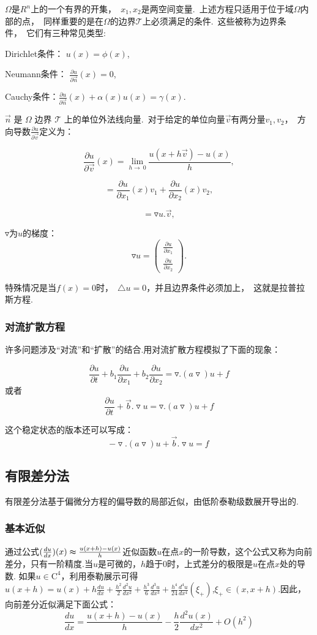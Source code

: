 \documentclass{article}
\begin{document}
$\Omega$是$R^n$上的一个有界的开集，~$x_1,x_2$是两空间变量.~上述方程只适用于位于域$\Omega$内部的点，~同样重要的是在$\Omega$的边界$\mathcal{T}$上必须满足的条件.~这些被称为边界条件，~它们有三种常见类型:

Dirichlet条件：           $u(x)=\phi (x)$,

Neumann条件：             $\frac{\partial u}{\partial \vec{n}}(x)=0$,

Cauchy条件：$\frac{\partial u}{\partial \vec{n}}(x)+\alpha(x)u(x)=\gamma (x)$.

 $\vec n$ 是 $\Omega$ 边界 $\mathcal{T}$ 上的单位外法线向量.~对于给定的单位向量$\vec{v}$有两分量$v_1,v_2$，~方向导数$\frac{\partial u}{\partial \vec{v}}$定义为：
 
 $$\frac{\partial u}{\partial \vec{v}}(x)=\lim_{h \to\ 0}\frac{u(x+h\vec{v})-u(x)}{h},$$

 $$=\frac{\partial u}{\partial x_1}(x)v_1+\frac{\partial u}{\partial x_2}(x)v_2,$$

 $$=\triangledown u.\vec{v},$$

 $\triangledown$为$u$的梯度：
 $$\triangledown u=\begin{pmatrix}
 \frac{\partial u}{\partial x_1} \\
\frac{\partial u}{\partial x_2}
\end{pmatrix}.$$

特殊情况是当$f(x)=0$时，~$\triangle u=0$，并且边界条件必须加上，~这就是拉普拉斯方程.



\subsubsection{对流扩散方程}
许多问题涉及“对流”和“扩散”的结合.用对流扩散方程模拟了下面的现象：

$$\dfrac{\partial u}{\partial t}+b_1\dfrac{\partial u}{\partial x_1}+b_2\dfrac{\partial u}{\partial x_2}=\triangledown .(a\triangledown)u+f$$
或者
$$\dfrac{\partial u}{\partial t}+\vec b.\triangledown u=\triangledown .(a\triangledown)u+f$$

这个稳定状态的版本还可以写成：$$-\triangledown .(a\triangledown)u+\vec b.\triangledown u=f$$

\subsection{有限差分法}
有限差分法基于偏微分方程的偏导数的局部近似，由低阶泰勒级数展开导出的.
\subsubsection{基本近似}
通过公式$(\frac{du}{dx})(x)\thickapprox \frac{u(x+h)-u(x)}{h}$近似函数$u$在点$x$的一阶导数，这个公式又称为向前差分，只有一阶精度.当$u$是可微的，$h$趋于$0$时，上式差分的极限是$u$在点$x$处的导数.
如果$u\in \mathrm{C}^4$，利用泰勒展示可得$u(x+h)=u(x)+h\frac{du}{dx}+\frac{h^2}{2}\frac{d^2u}{dx^2}+\frac{h^3}{6}\frac{d^3u}{dx^3}+\frac{h^4}{24}\frac{d^4u}{dx^4}(\xi _+)$,$\xi _+ \in (x,x+h)$.因此，向前差分近似满足下面公式：
$$\frac{du}{dx}=\frac{u(x+h)-u(x)}{h}-\frac{h}{2}\frac{d^2u(x)}{dx^2}+O(h^2)$$
\end{document}
